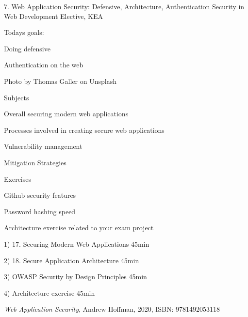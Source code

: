 \documentclass[Screen16to9,17pt]{foils}
\begin{document}
\mytitlepage
{7. Web Application Security: Defensive, Architecture, Authentication}
{Security in Web Development Elective, KEA}




Todays goals:
\begin{list2}
\item Doing defensive
\item Authentication on the web
\end{list2}

Photo by Thomas Galler on Unsplash




\begin{list1}
\item Subjects
\begin{list2}
\item Overall securing modern web applications
\item Processes involved in creating secure web applications
\item Vulnerability management
\item Mitigation Strategies
\end{list2}
\item Exercises
\begin{list2}
\item Github security features
\item Password hashing speed
\item Architecture exercise related to your exam project
\end{list2}
\end{list1}


\begin{list2}
\item 1) 17. Securing Modern Web Applications 45min
\item 2) 18. Secure Application Architecture 45min
\item 3) OWASP Security by Design Principles 45min
\item 4) Architecture exercise 45min
\end{list2}




\emph{Web Application Security}, Andrew Hoffman, 2020, ISBN: 9781492053118
\end{document}
